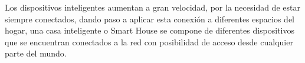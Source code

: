Los dispositivos inteligentes aumentan a gran velocidad, por la necesidad de estar siempre conectados, dando paso a aplicar esta conexión a diferentes espacios del hogar, una casa inteligente o Smart House se compone de diferentes dispositivos que se encuentran conectados a la red con posibilidad de acceso desde cualquier parte del mundo. \\
